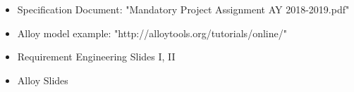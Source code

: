 \begin{itemize}
\item Specification Document: "Mandatory Project Assignment AY 2018-2019.pdf"
\item Alloy model example: "http://alloytools.org/tutorials/online/"
\item Requirement Engineering Slides I, II
\item Alloy Slides 
\end{itemize}
